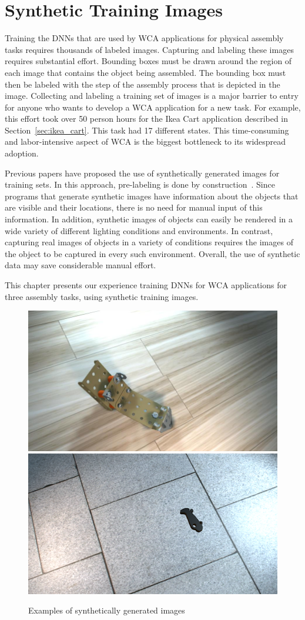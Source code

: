 \chapter{Synthetic Training Images}\label{chap:synthetic}

Training the DNNs that are used by WCA applications for physical assembly tasks
requires thousands of labeled images.
Capturing and labeling these images requires substantial effort.
Bounding boxes must be drawn around the region of each image that
contains the object being assembled.  The bounding box must then be
labeled with the step of the assembly process that is depicted in the
image.  Collecting and labeling a training set of images is a major
barrier to entry for anyone who wants to develop a WCA application for
a new task.
For example, this effort took over 50 person hours for the Ikea Cart application
described in Section~\ref{sec:ikea_cart}.
This task had 17 different states.
This time-consuming and labor-intensive
aspect of WCA is the biggest bottleneck to its widespread adoption.

Previous papers have proposed the use of synthetically generated
images for training sets.  In this approach, pre-labeling is done by
construction~\cite{synthetic_data, DBLP:journals/corr/abs-1809-10790,
  photo2, real_background1, real_background2, real_background3,
  dwibedi}.  Since programs that generate synthetic images have
information about the objects that are visible and their locations,
there is no need for manual input of this information.  In addition,
synthetic images of objects can easily be rendered in a wide variety
of different lighting conditions and environments.  In contrast,
capturing real images of objects in a variety of conditions requires
the images of the object to be captured in every such environment.
Overall, the use of synthetic data may save considerable manual
effort.

This chapter presents our experience training DNNs for WCA applications for
three assembly tasks, using synthetic training images.

\begin{figure}
  \includegraphics[width=0.5\columnwidth]{figures/synthetic/floor1.jpg}
  \includegraphics[width=0.5\columnwidth]{figures/synthetic/plane_train2.png}
  \caption{
    Examples of synthetically generated images
  }\label{fig:synthetic_examples}
\end{figure}

